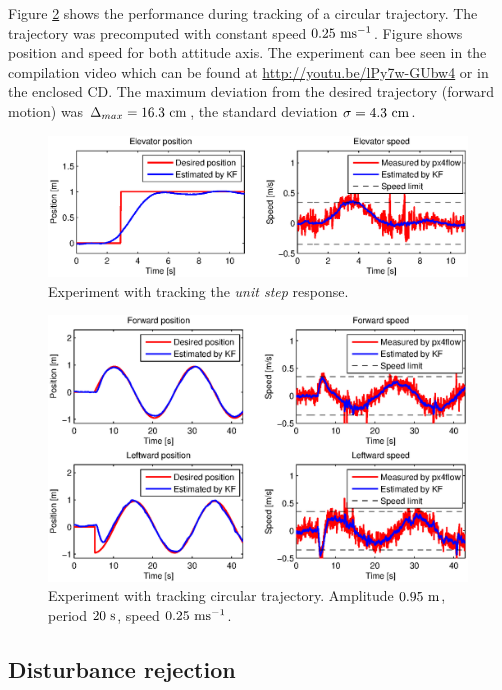Figure \ref{fig:experiment_sine_1} shows the performance during tracking of a circular trajectory. The trajectory was precomputed with constant speed $0.25~\mathrm{ms^{-1}}$. Figure shows position and speed for both attitude axis. The experiment can bee seen in the compilation video which can be found at \url{http://youtu.be/lPy7w-GUbw4} or in the enclosed CD. The maximum deviation from the desired trajectory (forward motion) was $\Delta_{max} = 16.3~\mathrm{cm}$, the standard deviation $\sigma = 4.3~\mathrm{cm}$.

\begin{figure}[h]
\centering
\includegraphics[width=0.99\textwidth]{fig/experiment2_step.eps}
\caption{Experiment with tracking the \emph{unit step} response.}
\label{fig:experiment_step}
\end{figure}

\begin{figure}[H]
\centering
\includegraphics[width=0.99\textwidth]{fig/experiment1_sine.eps}
\caption{Experiment with tracking circular trajectory. Amplitude $0.95~\mathrm{m}$, period $20~\mathrm{s}$, speed $0.25~\mathrm{ms^{-1}}$.}
\label{fig:experiment_sine_1}
\end{figure}

\subsection{Disturbance rejection}

